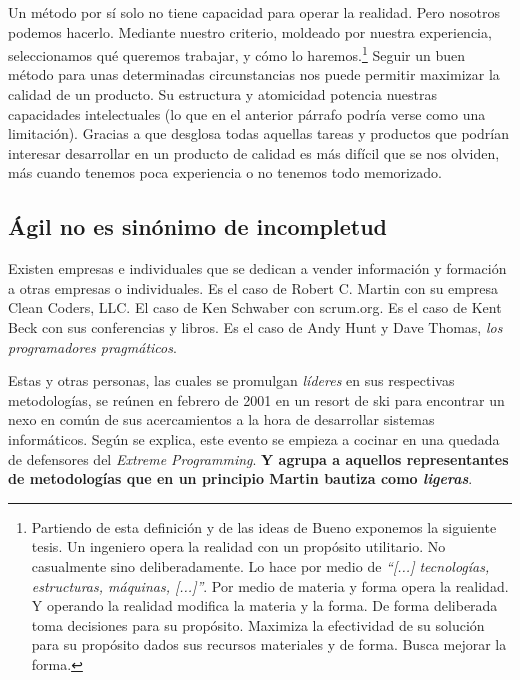 Un método por sí solo no tiene capacidad para operar la realidad. Pero nosotros podemos hacerlo.
Mediante nuestro criterio, moldeado por nuestra experiencia, seleccionamos qué queremos trabajar,
y cómo lo haremos\cite[Distinción entre método y metodología]{MetodoUNAM}.\footnote{%
Partiendo de esta definición y de las ideas de Bueno \cite{TeoríaDelCierreCategorial} exponemos
la siguiente tesis.
Un ingeniero opera la realidad con un propósito utilitario. No casualmente sino deliberadamente.
Lo hace por medio de \textit{``[...] tecnologías, estructuras, máquinas, [...]''}.
Por medio de materia y forma opera la realidad. Y operando la realidad modifica la materia y
la forma. De forma deliberada toma decisiones para su propósito. Maximiza la
efectividad de su solución para su propósito dados sus recursos materiales y de forma.
Busca mejorar la forma.
}
 Seguir un buen método para unas determinadas circunstancias nos puede permitir maximizar la
calidad de un producto. Su estructura y atomicidad potencia nuestras capacidades intelectuales
(lo que en el anterior párrafo podría verse como una limitación).
Gracias a que desglosa todas aquellas tareas y productos que podrían interesar desarrollar
en un producto de calidad es más difícil que se nos olviden, más cuando tenemos poca experiencia
o no tenemos todo memorizado.

\subsection{Ágil no es sinónimo de incompletud}

Existen empresas e individuales que se dedican a vender información y formación a otras empresas
o individuales. Es el caso de Robert C. Martin con su empresa Clean Coders, LLC. El caso de 
Ken Schwaber con scrum.org. Es el caso de Kent Beck con sus conferencias y libros. Es el caso
de Andy Hunt y Dave Thomas, \textit{los programadores pragmáticos}.

Estas y otras personas, las cuales se promulgan \textit{líderes} en sus respectivas metodologías,
se reúnen en febrero de 2001 en un resort de ski para encontrar un nexo en común
de sus acercamientos a la hora de desarrollar sistemas informáticos. Según se explica, este evento
se empieza a cocinar en una quedada de defensores del \textit{Extreme Programming}.
\textbf{Y agrupa a aquellos representantes de metodologías que en un principio 
Martin bautiza como \textit{ligeras}}.
\cite{HistoriaManifiestoAgilJim} \cite[Snowbird]{AgileBackToBasics}

